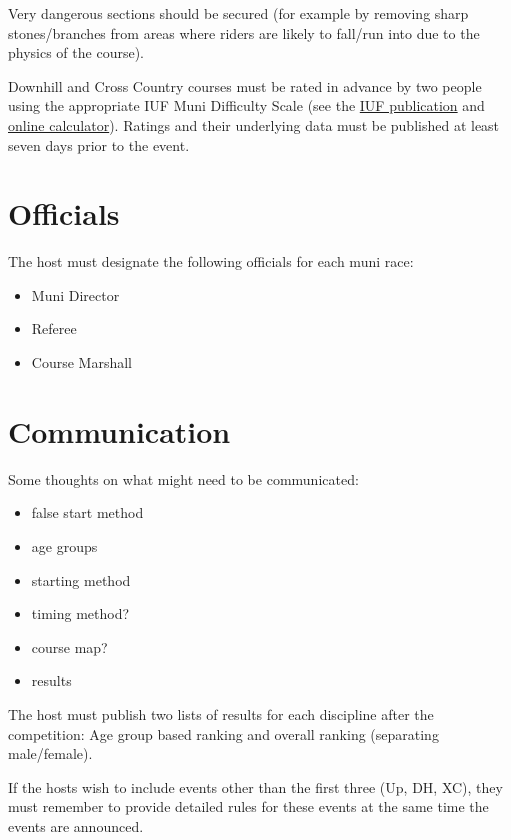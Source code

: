 Very dangerous sections should be secured (for example by removing sharp stones/branches from areas where riders are likely to fall/run into due to the physics of the course).

Downhill and Cross Country courses must be rated in advance by two people using the appropriate IUF Muni Difficulty Scale (see the \href{https://unicycling.org/files/iuf-muni-difficulty-scale.pdf}{IUF publication} and \href{https://muni-scale.info/}{online calculator}).
Ratings and their underlying data must be published at least seven days prior to the event.

\section{Officials}

The host must designate the following officials for each muni race:
\begin{itemize}
\item Muni Director
\item Referee
\item Course Marshall
\end{itemize}

\section{Communication}

\begin{comment2016}
Some thoughts on what might need to be communicated:
\begin{itemize}
\item false start method
\item age groups
\item starting method
\item timing method?
\item course map?
\item results
\end{itemize}
\end{comment2016}

The host must publish two lists of results for each discipline after the competition: Age group based ranking and overall ranking (separating
male/female).

If the hosts wish to include events other than the first three (Up, DH, XC), they must remember to provide detailed rules for these events at the same time the events are announced.

